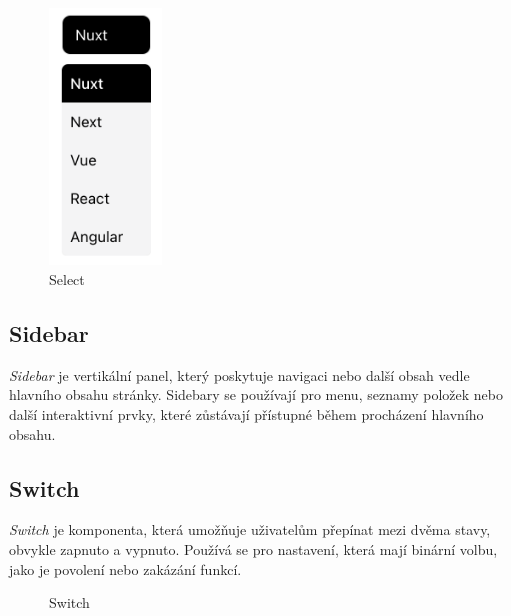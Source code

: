 \begin{figure}[H]
  \centering
  \includegraphics[width=3cm]{images/select}
  \captionsetup{justification=centering,margin=2cm}
  \caption{Select} \label{picture:select}
\end{figure}

\subsection{Sidebar}
\emph{Sidebar} je vertikální panel, který poskytuje navigaci nebo další obsah vedle hlavního obsahu stránky. Sidebary se používají pro menu, seznamy položek nebo další interaktivní prvky, které zůstávají přístupné během procházení hlavního obsahu.

\subsection{Switch}
\emph{Switch} je komponenta, která umožňuje uživatelům přepínat mezi dvěma stavy, obvykle zapnuto a vypnuto. Používá se pro nastavení, která mají binární volbu, jako je povolení nebo zakázání funkcí.

\begin{figure}[H]
  \centering
  \hspace{1cm}
  \captionsetup{justification=centering,margin=2cm}
  \caption{Switch}
\end{figure}

